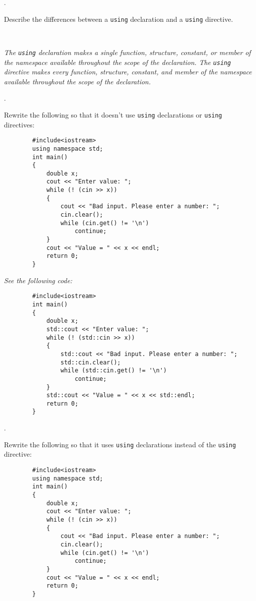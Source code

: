 \documentclass{amsart}
\begin{document}
. 
\begin{minipage}[t]{11.5 cm}
	Describe the differences between a \verb+using+ declaration and a \verb+using+ directive.
\end{minipage} \\[1ex]
\phantom{2. } 
\begin{minipage}[t]{11.5 cm}
	{\slshape 
	The \verb+using+ declaration makes a single function, structure, 
	constant, or member of the namespace available throughout the
	scope of the declaration.
	The \verb+using+ directive makes every function, structure, 
	constant, and member of the namespace available throughout the
	scope of the declaration.
	} 
\end{minipage} 
\vfill

. 
\begin{minipage}[t]{11.5 cm}
	Rewrite the following so that it doesn't use \verb+using+ declarations or \verb+using+ directives:
	\begin{verbatim}
		#include<iostream>
		using namespace std;
		int main()
		{
		    double x;
		    cout << "Enter value: ";
		    while (! (cin >> x))
		    {
		        cout << "Bad input. Please enter a number: ";
		        cin.clear();
		        while (cin.get() != '\n')
		            continue;
		    }
		    cout << "Value = " << x << endl;
		    return 0;
		}
	\end{verbatim}
\end{minipage}
\newpage

\phantom{}
\vfill
\phantom{3. } 
\begin{minipage}[t]{11.5 cm}
	{\slshape See the following code:}
	\begin{verbatim}
		#include<iostream>
		int main()
		{
		    double x;
		    std::cout << "Enter value: ";
		    while (! (std::cin >> x))
		    {
		        std::cout << "Bad input. Please enter a number: ";
		        std::cin.clear();
		        while (std::cin.get() != '\n')
		            continue;
		    }
		    std::cout << "Value = " << x << std::endl;
		    return 0;
		}
	\end{verbatim} 
\end{minipage} 
\vfill

. 
\begin{minipage}[t]{11.5 cm}
	Rewrite the following so that it uses \verb+using+ declarations instead of the \verb+using+ directive:
	\begin{verbatim}
		#include<iostream>
		using namespace std;
		int main()
		{
		    double x;
		    cout << "Enter value: ";
		    while (! (cin >> x))
		    {
		        cout << "Bad input. Please enter a number: ";
		        cin.clear();
		        while (cin.get() != '\n')
		            continue;
		    }
		    cout << "Value = " << x << endl;
		    return 0;
		}
	\end{verbatim}
\end{minipage}
\vfill
\newpage
\end{document}
